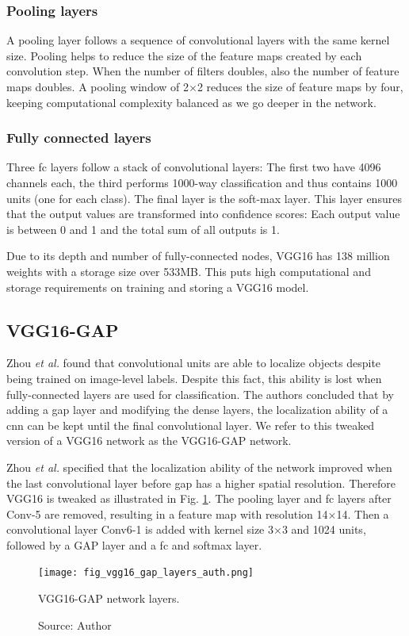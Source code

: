 \subsubsection{Pooling layers}
A pooling layer follows a sequence of convolutional layers with the same kernel size. Pooling helps to reduce the size of the feature maps created by each convolution step. When the number of filters doubles, also the number of feature maps doubles. A pooling window of 2$\times$2 reduces the size of feature maps by four, keeping computational complexity balanced as we go deeper in the network.

\subsubsection{Fully connected layers}
Three \acrfull{fc} layers follow a stack of convolutional layers: The first two have 4096 channels each, the third performs 1000-way  classification and thus contains 1000 units (one for each class). The final layer is the soft-max layer. This layer ensures that the output values are transformed into confidence scores: Each output value is between 0 and 1 and the total sum of all outputs is 1.

Due to its depth and number of fully-connected nodes, VGG16 has 138 million weights with a storage size over 533MB. This puts high computational and storage requirements on training and storing a VGG16 model.

\subsection{VGG16-GAP}
Zhou \textit{et al.} \cite{zhou2016cvpr} found that convolutional units are able to localize objects despite being trained on image-level labels. Despite this fact, this ability is lost when fully-connected layers are used for classification. The authors concluded that by adding a \acrfull{gap} layer and modifying the dense layers, the localization ability of a \acrshort{cnn} can be kept until the final convolutional layer. We refer to this tweaked version of a VGG16 network as the VGG16-GAP network.

Zhou \textit{et al.} specified that the localization ability of the network improved when the last convolutional layer before \acrshort{gap} has a higher spatial resolution. Therefore VGG16 is tweaked as illustrated in Fig. \ref{fig:vgg16_gap_layers_auth}. The pooling layer and \acrshort{fc} layers after Conv-5 are removed, resulting in a feature map with resolution 14$\times$14. Then a convolutional layer Conv6-1 is added with kernel size 3$\times$3 and 1024 units, followed by a GAP layer and a \acrshort{fc} and softmax layer.
\begin{figure}[ht]
    \begin{center}       
    \texttt{[image: fig\_vgg16\_gap\_layers\_auth.png]}
    \caption[VGG16-GAP network layers]{VGG16-GAP network layers.}
    \caption*{Source: Author}
    \label{fig:vgg16_gap_layers_auth}
    \end{center}
\end{figure}

